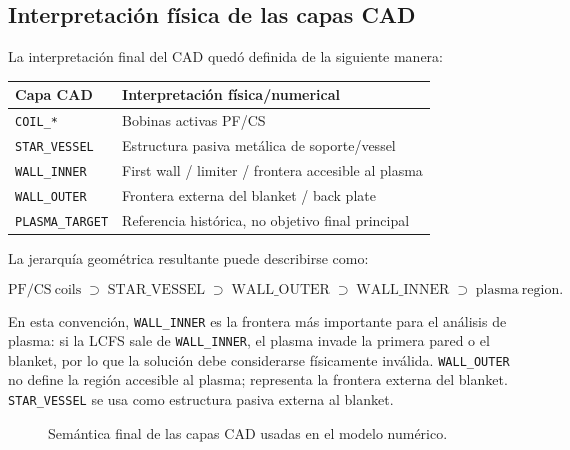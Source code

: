 \documentclass[11pt,a4paper]{article}
\begin{document}
\subsection{Interpretación física de las capas CAD}
La interpretación final del CAD quedó definida de la siguiente manera:

\begin{center}
\begin{tabular}{ll}
\toprule
\textbf{Capa CAD} & \textbf{Interpretación física/numerical} \\
\midrule
\texttt{COIL\_*} & Bobinas activas PF/CS \\
\texttt{STAR\_VESSEL} & Estructura pasiva metálica de soporte/vessel \\
\texttt{WALL\_INNER} & First wall / limiter / frontera accesible al plasma \\
\texttt{WALL\_OUTER} & Frontera externa del blanket / back plate \\
\texttt{PLASMA\_TARGET} & Referencia histórica, no objetivo final principal \\
\bottomrule
\end{tabular}
\end{center}

La jerarquía geométrica resultante puede describirse como:

\[
\mathrm{PF/CS\ coils}\;\supset\;\mathrm{STAR\_VESSEL}\;\supset\;\mathrm{WALL\_OUTER}\;\supset\;\mathrm{WALL\_INNER}\;\supset\;\mathrm{plasma\ region}.
\]

En esta convención, \texttt{WALL\_INNER} es la frontera más importante para el análisis de
plasma: si la LCFS sale de \texttt{WALL\_INNER}, el plasma invade la primera pared o el blanket,
por lo que la solución debe considerarse físicamente inválida. \texttt{WALL\_OUTER} no define
la región accesible al plasma; representa la frontera externa del blanket. \texttt{STAR\_VESSEL}
se usa como estructura pasiva externa al blanket.

\begin{figure}[htbp]
\centering
{}
\caption{Semántica final de las capas CAD usadas en el modelo numérico.}
\label{fig:cad_semantics_final_placeholder}
\end{figure}
\end{document}
